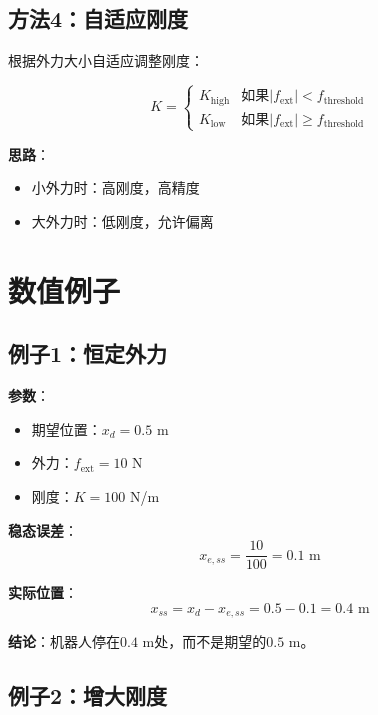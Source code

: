 \documentclass[12pt,a4paper]{article}
\begin{document}
\subsection{方法4：自适应刚度}

根据外力大小自适应调整刚度：

\begin{equation}
K = \begin{cases}
K_{\text{high}} & \text{如果} |f_{\text{ext}}| < f_{\text{threshold}} \\
K_{\text{low}} & \text{如果} |f_{\text{ext}}| \geq f_{\text{threshold}}
\end{cases}
\end{equation}

\textbf{思路}：
\begin{itemize}
\item 小外力时：高刚度，高精度
\item 大外力时：低刚度，允许偏离
\end{itemize}

\section{数值例子}

\subsection{例子1：恒定外力}

\textbf{参数}：
\begin{itemize}
\item 期望位置：$x_d = 0.5$ m
\item 外力：$f_{\text{ext}} = 10$ N
\item 刚度：$K = 100$ N/m
\end{itemize}

\textbf{稳态误差}：
\begin{equation}
x_{e,ss} = \frac{10}{100} = 0.1 \text{ m}
\end{equation}

\textbf{实际位置}：
\begin{equation}
x_{ss} = x_d - x_{e,ss} = 0.5 - 0.1 = 0.4 \text{ m}
\end{equation}

\textbf{结论}：机器人停在$0.4$ m处，而不是期望的$0.5$ m。

\subsection{例子2：增大刚度}
\end{document}
